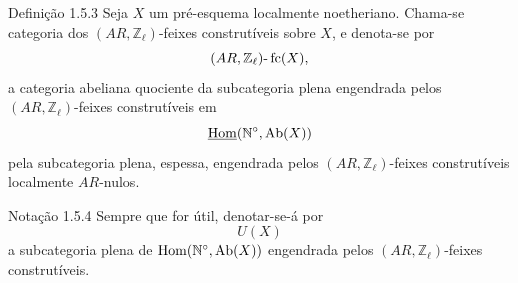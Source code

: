 \begin{statement}{Definição 1.5.3}
Seja \(X\) um pré-esquema localmente noetheriano. Chama-se categoria dos \((AR,\mathbb Z_\ell)\)-feixes construtíveis sobre \(X\), e denota-se por
\[
(AR,\mathbb Z_\ell)\text{-}\operatorname{fc}(X),
\]
a categoria abeliana quociente da subcategoria plena engendrada pelos \((AR,\mathbb Z_\ell)\)-feixes construtíveis em
\[
\underline{\operatorname{Hom}}(\mathbb N^\circ,\operatorname{Ab}(X))
\]
pela subcategoria plena, espessa, engendrada pelos \((AR,\mathbb Z_\ell)\)-feixes construtíveis localmente \(AR\)-nulos.
\end{statement}

\begin{statement}{Notação 1.5.4}
Sempre que for útil, denotar-se-á por
\[
U(X)
\]
a subcategoria plena de \(\operatorname{Hom}(\mathbb N^\circ,\operatorname{Ab}(X))\) engendrada pelos \((AR,\mathbb Z_\ell)\)-feixes construtíveis.
\end{statement}
